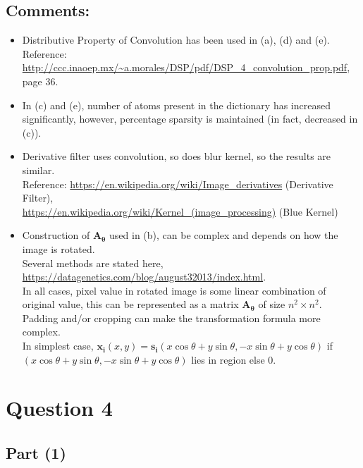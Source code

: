 \documentclass[fleqn, 11pt]{article}
\begin{document}
\subsection*{Comments:}
\begin{itemize}
    \item Distributive Property of Convolution has been used in (a), (d) and (e). \\ Reference: \url{http://ccc.inaoep.mx/~a.morales/DSP/pdf/DSP_4_convolution_prop.pdf}, page 36.
    \item In (c) and (e), number of atoms present in the dictionary has increased significantly, however, percentage sparsity is maintained (in fact, decreased in (c)).
    \item Derivative filter uses convolution, so does blur kernel, so the results are similar. \\
    Reference: \url{https://en.wikipedia.org/wiki/Image_derivatives} (Derivative Filter), \\ \url{https://en.wikipedia.org/wiki/Kernel_(image_processing)} (Blue Kernel)
    \item Construction of $\boldsymbol{A_\theta}$ used in (b), can be complex and depends on how the image is rotated. \\
    Several methods are stated here, \url{https://datagenetics.com/blog/august32013/index.html}. \\
    In all cases, pixel value in rotated image is some linear combination of original value, this can be represented as a matrix $\boldsymbol{A_\theta}$ of size $n^2 \times n^2$. \\
    Padding and/or cropping can make the transformation formula more complex. \\
    In simplest case, $\boldsymbol{x_i}(x, y) = \boldsymbol{s_i}(x \cos{\theta} + y \sin{\theta}, -x \sin{\theta} + y \cos{\theta})$ if $(x \cos{\theta} + y \sin{\theta}, -x \sin{\theta} + y \cos{\theta})$ lies in region else $0$.
\end{itemize}


\newpage
\section*{Question 4}
\setcounter{equation}{0}

\subsection*{Part (1)}
\end{document}

